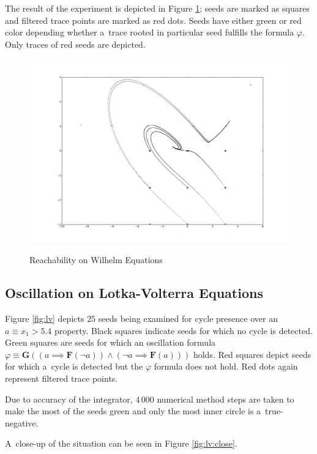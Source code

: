 \documentclass[12pt,twoside,draft]{fithesis}
\newcommand{\bF}{\mathbf{F}}
\newcommand{\bG}{\mathbf{G}}
\begin{document}
The result of the experiment is depicted in Figure \ref{fig:wh};
seeds are marked as squares and filtered trace points are marked
as red dots. Seeds have either green or red color depending whether
a~trace rooted in particular seed fulfills the formula $\varphi$.
Only traces of red seeds are depicted.
\begin{figure}[h]
\center
\includegraphics[scale=0.31,draft=false]{wh_reachability}
\label{fig:wh}
\caption{Reachability on Wilhelm Equations}
\end{figure}

\subsection*{Oscillation on Lotka-Volterra Equations}
Figure \ref{fig:lv} depicts $25$ seeds being examined for cycle presence
over an~$a\equiv x_1>5.4$ property. Black squares indicate seeds
for which no cycle is detected. Green squares are seeds for which
an oscillation formula
$\varphi\equiv\bG((a\implies\bF(\neg a))\wedge(\neg a\implies\bF(a)))$
holds. Red squares depict seeds for which a~cycle is detected but the
$\varphi$ formula does not hold. Red dots again represent filtered trace
points.

Due to accuracy of the integrator, 4\,000 numerical method
steps are taken to make the most of the seeds green and only the most
inner circle is a~true-negative. 

A~close-up of the situation can be seen in Figure \ref{fig:lv:close}.
\end{document}
